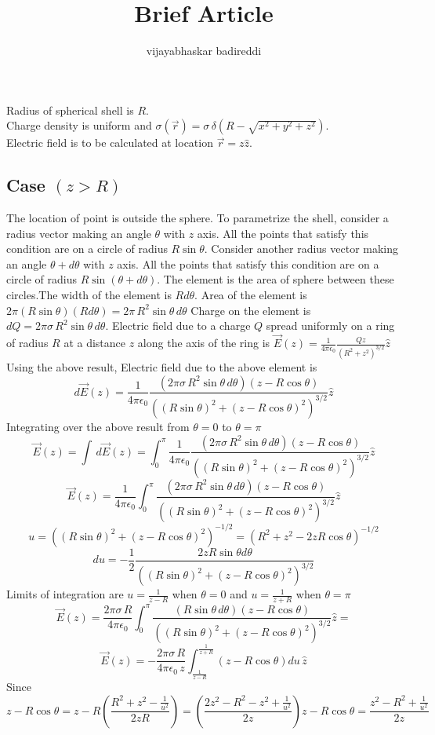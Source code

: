 \documentclass[12pt]{article}
\title{Brief Article}
\author{vijayabhaskar badireddi}
\begin{document}
Radius of spherical shell is $R$.\\
Charge density is uniform  and $\sigma(\vec{r})=\sigma\,\delta\left(R-\sqrt{x^2+y^2+z^2}\right)$.\\
Electric field is to be calculated at location $\vec{r}=z\hat{z}$.
\subsection*{Case $(z>R)$} 
The location of point is outside the sphere.
To parametrize the shell, consider a radius vector making an angle $\theta$ with $z$ axis. All the points that satisfy this condition are on a circle of radius $R\sin{\theta}$. Consider another radius vector making an angle $\theta+d\theta$ with $z$ axis. All the points that satisfy this condition are on a circle of radius $R\sin{(\theta+d\theta)}$. The element is the area of sphere between these circles.The width of the element is $Rd\theta$. Area of the element is $2\pi(R\sin{\theta})(Rd\theta)=2\pi\,R^2\sin{\theta}\,d\theta$
Charge on the element is $dQ=2\pi\sigma\,R^2\sin{\theta}\,d\theta$.
Electric field due to a charge $Q$ spread uniformly on a ring of radius $R$ at a distance $z$ along the axis of the ring is $\vec{E}(z)=\frac{1}{4\pi\epsilon_0}\frac{Qz}{(R^2+z^2)^{3/2}}\hat{z}$
Using the above result,
Electric field due to the above element is $$d\vec{E}(z)=\frac{1}{4\pi\epsilon_0}\frac{(2\pi\sigma\,R^2\sin{\theta}\,d\theta)(z-R\cos{\theta})}{((R\sin{\theta})^2+(z-R\cos{\theta})^2)^{3/2}}\hat{z}$$
Integrating over the above result from $\theta=0$ to $\theta=\pi$
$$\vec{E}(z)=\int\,d\vec{E}(z)=\int_{0}^{\pi}\frac{1}{4\pi\epsilon_0}\frac{(2\pi\sigma\,R^2\sin{\theta}\,d\theta)(z-R\cos{\theta})}{((R\sin{\theta})^2+(z-R\cos{\theta})^2)^{3/2}}\hat{z}$$
$$\vec{E}(z)=\frac{1}{4\pi\epsilon_0}\int_{0}^{\pi}\frac{(2\pi\sigma\,R^2\sin{\theta}\,d\theta)(z-R\cos{\theta})}{((R\sin{\theta})^2+(z-R\cos{\theta})^2)^{3/2}}\hat{z}$$
$$u=((R\sin{\theta})^2+(z-R\cos{\theta})^2)^{-1/2}=(R^2+z^2-2zR\cos{\theta})^{-1/2}$$
$$du=-\frac{1}{2}\frac{2zR\sin{\theta}d{\theta}}{((R\sin{\theta})^2+(z-R\cos{\theta})^2)^{3/2}}$$
Limits of integration are $u=\frac{1}{z-R}$ when $\theta=0$ and $u=\frac{1}{z+R}$ when $\theta=\pi$
$$\vec{E}(z)=\frac{2\pi\sigma\,R}{4\pi\epsilon_0}\int_{0}^{\pi}\frac{(R\sin{\theta}\,d\theta)(z-R\cos{\theta})}{((R\sin{\theta})^2+(z-R\cos{\theta})^2)^{3/2}}\hat{z}=
$$
$$\vec{E}(z)=-\frac{2\pi\sigma\,R}{4\pi\epsilon_0\,z}\int_{\frac{1}{z-R}}^{\frac{1}{z+R}}(z-R\cos{\theta})du\,\hat{z}$$
Since $$z-R\cos{\theta}=z-R\left(\frac{R^2+z^2-\frac{1}{u^2}}{2zR} \right )=\left(\frac{2z^2-R^2-z^2+\frac{1}{u^2}}{2z} \right )z-R\cos{\theta}=\frac{z^2-R^2+\frac{1}{u^2}}{2z}$$
\end{document}
